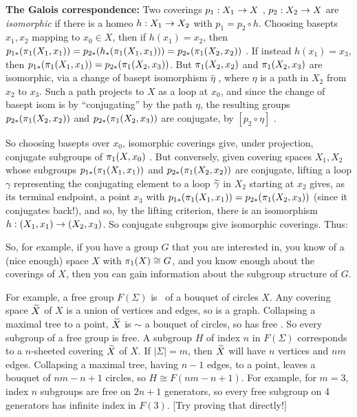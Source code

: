 \msk

{\bf The Galois correspondence:} Two coverings
$p_1:X_1\rightarrow X$ , $p_2:X_2\rightarrow X$ are {\it isomorphic} if there is a homeo
$h:X_1\rightarrow X_2$ with $p_1=p_2\circ h$. Choosing basepts $x_1,x_2$ mapping to $x_0\in X$,
then if $h(x_1)=x_2$, then $p_{1*}(\pi_1(X_1,x_1)) = p_{2*}(h_*(\pi_1(X_1,x_1))) = 
p_{2*}(\pi_1(X_2,x_2))$ . If instead $h(x_1)=x_3$, then $p_{1*}(\pi_1(X_1,x_1)) = p_{2*}(\pi_1(X_2,x_3))$.
But  $\pi_1(X_2,x_2)$ and $\pi_1(X_2,x_3)$ are isomorphic, via a change 
of basept isomorphism $\widehat{\eta}$ , where $\eta$ is a path in $X_2$ from $x_2$ to $x_3$.
Such a path projects to $X$ as a loop at $x_0$, and since the change of basept isom
is by ``conjugating'' by the path $\eta$, the resulting groups 
$p_{2*}(\pi_1(X_2,x_2))$ and $p_{2*}(\pi_1(X_2,x_3))$
are conjugate, by $[p_2\circ \eta]$ . 

\ssk

So choosing  basepts over $x_0$, isomorphic coverings give,
under projection, conjugate subgroups of $\pi_1(X,x_0)$ . But conversely, given covering spaces
$X_1,X_2$ whose subgroups $p_{1*}(\pi_1(X_1,x_1))$ and $p_{2*}(\pi_1(X_2,x_2))$ are conjugate,
lifting a loop $\gamma$ representing the conjugating element to a loop $\widetilde{\gamma}$ in
$X_2$ starting at $x_2$ gives, as its terminal endpoint, a point $x_3$ with 
$p_{1*}(\pi_1(X_1,x_1)) = p_{2*}(\pi_1(X_2,x_3))$ (since it conjugates back!), and so, by the lifting criterion,
there is an isomorphism $h:(X_1,x_1) \rightarrow (X_2,x_3)$. So conjugate subgroups give isomorphic coverings.
Thus: 

\vfill
\eject


\msk

So, for example, if you have a group $G$ that you are interested in, you know of a (nice enough) 
space $X$ with $\pi_1(X)\cong G$, and you know enough about the coverings of $X$, then you can
gain information about the subgroup structure of $G$. 

\msk

For example, a free group $F(\Sigma)$ is \mpu\ of a bouquet of circles $X$. 
Any covering space $\widetilde{X}$ of $X$ is a union of vertices and edges, so is a graph.  Collapsing
a maximal tree to a point, $\widetilde{X}$ is $\sim$ a bouquet of circles, so has free \mpu . So every
subgroup of a free group is free. 
A subgroup $H$ of index $n$ in $F(\Sigma)$ corresponds to a $n$-sheeted covering $\widetilde{X}$ of $X$. If
$|\Sigma| = m$, then $\widetilde{X}$ will have $n$ vertices and $nm$ edges. Collapsing a maximal
tree, having $n-1$ edges, to a point, leaves a bouquet of $nm-n+1$ circles, so $H\cong F(nm-n+1)$.
For example, for $m=3$, index $n$ subgroups are free on $2n+1$ generators, so every free subgroup
on 4 generators has infinite index in $F(3)$. [Try proving that directly!]

